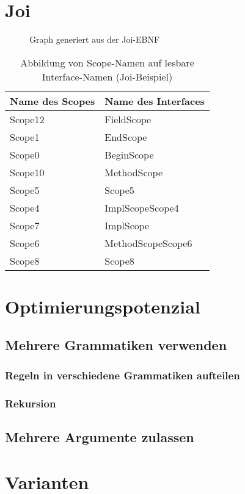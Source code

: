\documentclass[../InterneDSLs.tex]{subfiles}
\begin{document}
\section{Joi}
\begin{figure}[ht]
    
\end{figure}

\begin{figure}[ht]
\centering
\resizebox{0.5\linewidth}{!}{}
\caption{Graph generiert aus der Joi-EBNF}
\label{FIG:JoiGraph}
\end{figure}

\begin{table}[ht]
\centering
\begin{tabular}{ll}
\textbf{Name des Scopes} & \textbf{Name des Interfaces}\\\hline
Scope12 & FieldScope\\
Scope1  & EndScope\\
Scope0  & BeginScope\\
Scope10 & MethodScope\\
Scope5  & Scope5\\
Scope4  & ImplScopeScope4\\
Scope7  & ImplScope\\
Scope6  & MethodScopeScope6\\
Scope8  & Scope8\\
\end{tabular}
\caption[Abbildung von Scope- auf Interfacenamen (Joi-Beispiel)]{Abbildung von Scope-Namen auf lesbare Interface-Namen (Joi-Beispiel)}
\label{TAB:MappingJoiScopeToInterface}
\end{table}

\section{Optimierungspotenzial}
\subsection{Mehrere Grammatiken verwenden}
\subsubsection{Regeln in verschiedene Grammatiken aufteilen}
\subsubsection{Rekursion}
\subsection{Mehrere Argumente zulassen}

\section{Varianten}
\end{document}
